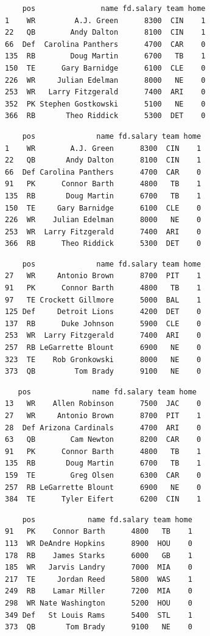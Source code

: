 \documentclass[10pt]{article}
\begin{document}
\begin{lstlisting}
    pos               name fd.salary team home
1    WR         A.J. Green      8300  CIN    1
22   QB        Andy Dalton      8100  CIN    1
66  Def  Carolina Panthers      4700  CAR    0
135  RB        Doug Martin      6700   TB    1
150  TE      Gary Barnidge      6100  CLE    0
226  WR     Julian Edelman      8000   NE    0
253  WR   Larry Fitzgerald      7400  ARI    0
352  PK Stephen Gostkowski      5100   NE    0
366  RB       Theo Riddick      5300  DET    0
\end{lstlisting}

\begin{lstlisting}
    pos              name fd.salary team home
1    WR        A.J. Green      8300  CIN    1
22   QB       Andy Dalton      8100  CIN    1
66  Def Carolina Panthers      4700  CAR    0
91   PK      Connor Barth      4800   TB    1
135  RB       Doug Martin      6700   TB    1
150  TE     Gary Barnidge      6100  CLE    0
226  WR    Julian Edelman      8000   NE    0
253  WR  Larry Fitzgerald      7400  ARI    0
366  RB      Theo Riddick      5300  DET    0
\end{lstlisting}

\begin{lstlisting}
    pos              name fd.salary team home
27   WR     Antonio Brown      8700  PIT    1
91   PK      Connor Barth      4800   TB    1
97   TE Crockett Gillmore      5000  BAL    1
125 Def     Detroit Lions      4200  DET    0
137  RB      Duke Johnson      5900  CLE    0
253  WR  Larry Fitzgerald      7400  ARI    0
257  RB LeGarrette Blount      6900   NE    0
323  TE    Rob Gronkowski      8000   NE    0
373  QB         Tom Brady      9100   NE    0
\end{lstlisting}

\begin{lstlisting}
   pos              name fd.salary team home
13   WR    Allen Robinson      7500  JAC    0
27   WR     Antonio Brown      8700  PIT    1
28  Def Arizona Cardinals      4700  ARI    0
63   QB        Cam Newton      8200  CAR    0
91   PK      Connor Barth      4800   TB    1
135  RB       Doug Martin      6700   TB    1
159  TE        Greg Olsen      6300  CAR    0
257  RB LeGarrette Blount      6900   NE    0
384  TE      Tyler Eifert      6200  CIN    1
\end{lstlisting}

\begin{lstlisting}
    pos            name fd.salary team home
91   PK    Connor Barth      4800   TB    1
113  WR DeAndre Hopkins      8900  HOU    0
178  RB    James Starks      6000   GB    1
185  WR   Jarvis Landry      7000  MIA    0
217  TE     Jordan Reed      5800  WAS    1
249  RB    Lamar Miller      7200  MIA    0
298  WR Nate Washington      5200  HOU    0
349 Def   St Louis Rams      5400  STL    1
373  QB       Tom Brady      9100   NE    0
\end{lstlisting}
\end{document}
